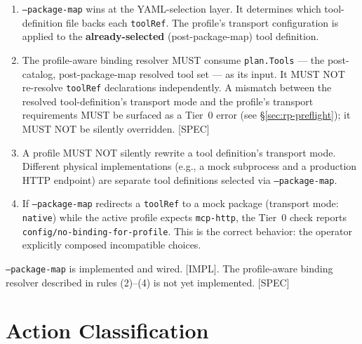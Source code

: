 \begin{enumerate}
  \item \texttt{--package-map} wins at the YAML-selection layer.  It
        determines which tool-definition file backs each \texttt{toolRef}.
        The profile's transport configuration is applied to the
        \textbf{already-selected} (post-package-map) tool definition.

  \item The profile-aware binding resolver MUST consume
        \texttt{plan.Tools} — the post-catalog, post-package-map resolved
        tool set — as its input.  It MUST NOT re-resolve \texttt{toolRef}
        declarations independently.  A mismatch between the resolved
        tool-definition's transport mode and the profile's transport
        requirements MUST be surfaced as a Tier~0 error (see
        \S\ref{sec:rp-preflight}); it MUST NOT be silently overridden.
        [SPEC]

  \item A profile MUST NOT silently rewrite a tool definition's transport
        mode.  Different physical implementations (e.g., a mock subprocess
        and a production HTTP endpoint) are separate tool definitions
        selected via \texttt{--package-map}.

  \item If \texttt{--package-map} redirects a \texttt{toolRef} to a mock
        package (transport mode: \texttt{native}) while the active profile
        expects \texttt{mcp-http}, the Tier~0 check reports
        \texttt{config/no-binding-for-profile}.  This is the correct
        behavior: the operator explicitly composed incompatible choices.
\end{enumerate}

\begin{tcolorbox}[colback=blue!5, colframe=blue!40, title=Non-Normative Note — Current State]
  \texttt{--package-map} is implemented and wired.  [IMPL].  The
  profile-aware binding resolver described in rules (2)–(4) is not yet
  implemented.  [SPEC]
\end{tcolorbox}

\section{Action Classification}
\label{sec:rp-classification}


